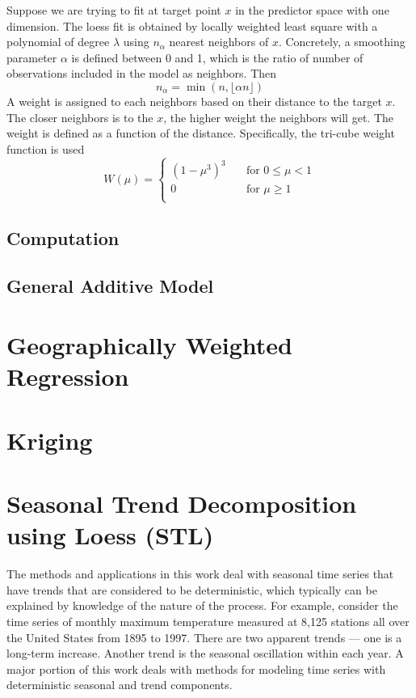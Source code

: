 Suppose we are trying to fit at target point $x$ in the predictor space with
one dimension. The loess fit is obtained by locally weighted least square with a
polynomial of degree $\lambda$ using $n_{\alpha}$ nearest neighbors of $x$. 
Concretely, a smoothing parameter $\alpha$ is defined between 0 and 1, which is
the ratio of number of observations included in the model as neighbors. Then 
\begin{equation} 
n_{\alpha} = \min(n, \lfloor \alpha n \rfloor)
\end{equation}
A weight is assigned to each neighbors based on their distance to the target $x$.
The closer neighbors is to the $x$, the higher weight the neighbors will get. The
weight is defined as a function of the distance. Specifically, the tri-cube weight 
function is used
\begin{equation} 
W(\mu) =
  \begin{cases}
    (1 - \mu^3)^3       & \quad \text{for } 0 \le \mu < 1\\
    0  & \quad \text{for } \mu \ge 1\\
  \end{cases}
\end{equation}




\subsection{Computation}

\subsection{General Additive Model}

\section{Geographically Weighted Regression}

\section{Kriging}

\section{Seasonal Trend Decomposition using Loess (STL)}
\label{sec:stl}
The methods and applications in this work deal with seasonal time series
that have trends that are considered to be deterministic, which typically can be
explained by knowledge of the nature of the process. For example, consider the
time series of monthly maximum temperature measured at 8,125 stations all over 
the United States from 1895 to 1997. There are two apparent trends --- one is a
long-term increase. Another trend is the seasonal oscillation within each year.
A major portion of this work deals with methods for modeling time series with
deterministic seasonal and trend components.

